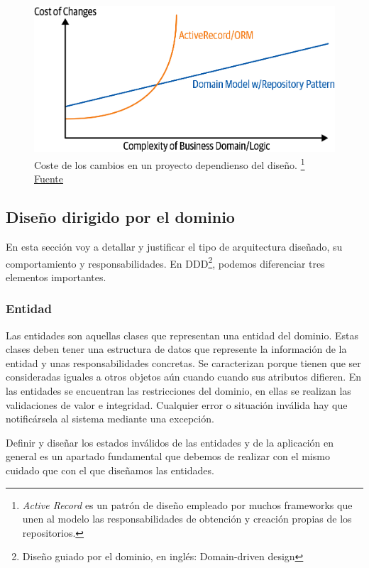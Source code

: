 \FloatBarrier
\begin{figure}[h]
	\centering	
	\includegraphics[width=\textwidth]{doc/logos/imgs/costeEvolucion.png}
    \caption{Coste de los cambios en un proyecto dependienso del diseño.
    \footnote{\textit{Active Record} es un patrón de diseño empleado por muchos frameworks
    que unen al modelo las responsabilidades de obtención y creación propias de los
    repositorios.} \href{https://www.cosmicpython.com/book/images/apwp_0205.png}{Fuente}}
    \label{fig:coste-repo-pattern}
\end{figure}
\FloatBarrier


\subsection{Diseño dirigido por el dominio}
En esta sección voy a detallar y justificar el tipo de arquitectura diseñado, su
comportamiento y responsabilidades. En DDD\footnote{Diseño guiado por el dominio, en
inglés: Domain-driven design}, podemos diferenciar tres elementos importantes.

\subsubsection{Entidad}
Las entidades son aquellas clases que representan una entidad del dominio. Estas clases
deben tener una estructura de datos que represente la información de la entidad y unas
responsabilidades concretas. Se caracterizan porque tienen que ser consideradas iguales a
otros objetos aún cuando cuando sus atributos difieren. En las entidades se encuentran las
restricciones del dominio, en ellas se realizan las validaciones de valor e integridad.
Cualquier error o situación inválida hay que notificársela al sistema mediante una
excepción. 

Definir y diseñar los estados inválidos de las entidades y de la aplicación en general es
un apartado fundamental que debemos de realizar con el mismo cuidado que con el que
diseñamos las entidades.


